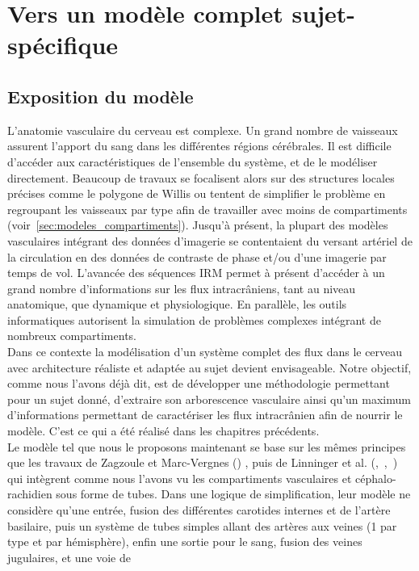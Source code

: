 \section{Vers un modèle complet sujet-spécifique}
\subsection{Exposition du modèle}
L’anatomie vasculaire du cerveau est complexe. Un grand nombre de vaisseaux assurent
l’apport du sang dans les différentes régions cérébrales. Il est difficile d’accéder aux caractéristiques de l’ensemble du système, et de le modéliser directement. Beaucoup de travaux se focalisent alors sur
des structures locales précises comme le polygone de Willis ou tentent de simplifier le problème en
regroupant les vaisseaux par type afin de travailler avec moins de compartiments (voir~\ref{sec:modeles_compartiments}). Jusqu’à
présent, la plupart des modèles vasculaires intégrant des données d’imagerie se contentaient du
versant artériel de la circulation en des données de contraste de phase et/ou d’une imagerie par temps
de vol. L’avancée des séquences IRM permet à présent d’accéder à un grand nombre d’informations
sur les flux intracrâniens, tant au niveau anatomique, que dynamique et physiologique. En parallèle,
les outils informatiques autorisent la simulation de problèmes complexes intégrant de nombreux
compartiments.\\
Dans ce contexte la modélisation d’un système complet des flux dans le cerveau avec
architecture réaliste et adaptée au sujet devient envisageable. Notre objectif, comme nous l’avons
déjà dit, est de développer une méthodologie permettant pour un sujet donné, d’extraire son
arborescence vasculaire ainsi qu’un maximum d’informations permettant de caractériser les flux
intracrânien afin de nourrir le modèle. C’est ce qui a été réalisé dans les chapitres précédents.\\
Le modèle tel que nous le proposons maintenant se base sur les mêmes principes que les
travaux de Zagzoule et Marc-Vergnes (\cite{Zagzoule1986}) , puis de Linninger et al. (\cite{Linninger2005},~\cite{Linninger2007},~\cite{Linninger2009}) qui intègrent comme
nous l’avons vu les compartiments vasculaires et céphalo-rachidien sous forme de tubes. Dans une
logique de simplification, leur modèle ne considère qu’une entrée, fusion des différentes carotides
internes et de l’artère basilaire, puis un système de tubes simples allant des artères aux veines (1 par
type et par hémisphère), enfin une sortie pour le sang, fusion des veines jugulaires, et une voie de
